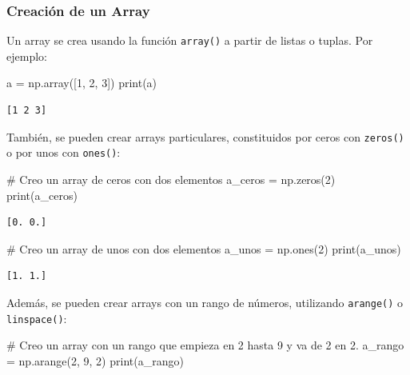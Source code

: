 \documentclass[
  letterpaper,
  DIV=11,
  numbers=noendperiod]{scrreprt}
\newenvironment{Shaded}{\begin{snugshade}}{\end{snugshade}}
\newcommand{\BuiltInTok}[1]{\textcolor[rgb]{0.00,0.23,0.31}{#1}}
\newcommand{\CommentTok}[1]{\textcolor[rgb]{0.37,0.37,0.37}{#1}}
\newcommand{\DecValTok}[1]{\textcolor[rgb]{0.68,0.00,0.00}{#1}}
\newcommand{\NormalTok}[1]{\textcolor[rgb]{0.00,0.23,0.31}{#1}}
\newcommand{\OperatorTok}[1]{\textcolor[rgb]{0.37,0.37,0.37}{#1}}
\begin{document}
\subsubsection{Creación de un Array}\label{creaciuxf3n-de-un-array}

Un array se crea usando la función \texttt{array()} a partir de listas o
tuplas. Por ejemplo:

\begin{Shaded}
\begin{Highlighting}[]
\NormalTok{a }\OperatorTok{=}\NormalTok{ np.array([}\DecValTok{1}\NormalTok{, }\DecValTok{2}\NormalTok{, }\DecValTok{3}\NormalTok{])}
\BuiltInTok{print}\NormalTok{(a)}
\end{Highlighting}
\end{Shaded}

\begin{verbatim}
[1 2 3]
\end{verbatim}

También, se pueden crear arrays particulares, constituidos por ceros con
\texttt{zeros()} o por unos con \texttt{ones()}:

\begin{Shaded}
\begin{Highlighting}[]
\CommentTok{\# Creo un array de ceros con dos elementos}
\NormalTok{a\_ceros }\OperatorTok{=}\NormalTok{ np.zeros(}\DecValTok{2}\NormalTok{)}
\BuiltInTok{print}\NormalTok{(a\_ceros)}
\end{Highlighting}
\end{Shaded}

\begin{verbatim}
[0. 0.]
\end{verbatim}

\begin{Shaded}
\begin{Highlighting}[]
\CommentTok{\# Creo un array de unos con dos elementos}
\NormalTok{a\_unos }\OperatorTok{=}\NormalTok{ np.ones(}\DecValTok{2}\NormalTok{)}
\BuiltInTok{print}\NormalTok{(a\_unos)}
\end{Highlighting}
\end{Shaded}

\begin{verbatim}
[1. 1.]
\end{verbatim}

Además, se pueden crear arrays con un rango de números, utilizando
\texttt{arange()} o \texttt{linspace()}:

\begin{Shaded}
\begin{Highlighting}[]
\CommentTok{\# Creo un array con un rango que empieza en 2 hasta 9 y va de 2 en 2.}
\NormalTok{a\_rango }\OperatorTok{=}\NormalTok{ np.arange(}\DecValTok{2}\NormalTok{, }\DecValTok{9}\NormalTok{, }\DecValTok{2}\NormalTok{)}
\BuiltInTok{print}\NormalTok{(a\_rango)}
\end{Highlighting}
\end{Shaded}
\end{document}
